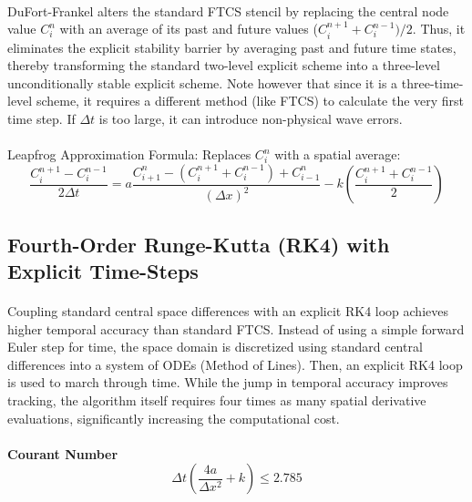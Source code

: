 \paragraph{}
DuFort-Frankel alters the standard FTCS stencil by replacing the central node value $C_i^n$ with an average of its past and future values ($C_i^{n+1} + C_i^{n-1})/2$. Thus, it eliminates the explicit stability barrier by averaging past and future time states, thereby transforming the standard two-level explicit scheme into a three-level unconditionally stable explicit scheme. Note however that since it is a three-time-level scheme, it requires a different method (like FTCS) to calculate the very first time step. If $\Delta t$ is too large, it can introduce non-physical wave errors.
\paragraph{}
Leapfrog Approximation Formula: Replaces $C_i^n$ with a spatial average:
\begin{equation*}
\frac{C_i^{n+1} - C_i^{n-1}}{2\Delta t} = a \frac{C_{i+1}^n - (C_i^{n+1} + C_i^{n-1}) + C_{i-1}^n}{(\Delta x)^2} - k \left( \frac{C_i^{n+1} + C_i^{n-1}}{2} \right)
\end{equation*}

\subsection*{Fourth-Order Runge-Kutta (RK4) with Explicit Time-Steps}
\paragraph{}
Coupling standard central space differences with an explicit RK4 loop achieves higher temporal accuracy than standard FTCS. Instead of using a simple forward Euler step for time, the space domain is discretized using standard central differences into a system of ODEs (Method of Lines).  Then, an explicit RK4 loop is used to march through time. While the jump in temporal accuracy improves tracking, the algorithm itself requires four times as many spatial derivative evaluations, significantly increasing the computational cost. 
\paragraph{} 
\textbf{Courant Number}
\begin{equation*}
\Delta t(\frac{4a}{\Delta x^2} + k) \leq 2.785
\end{equation*}

